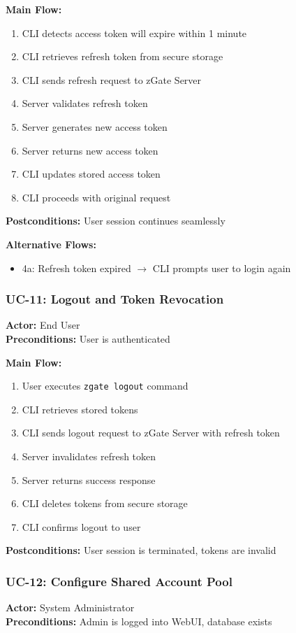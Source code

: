 \textbf{Main Flow:}
\begin{enumerate}
    \item CLI detects access token will expire within 1 minute
    \item CLI retrieves refresh token from secure storage
    \item CLI sends refresh request to zGate Server
    \item Server validates refresh token
    \item Server generates new access token
    \item Server returns new access token
    \item CLI updates stored access token
    \item CLI proceeds with original request
\end{enumerate}

\textbf{Postconditions:} User session continues seamlessly

\textbf{Alternative Flows:}
\begin{itemize}
    \item 4a: Refresh token expired $\rightarrow$ CLI prompts user to login again
\end{itemize}

\subsubsection{UC-11: Logout and Token Revocation}
\textbf{Actor:} End User \\
\textbf{Preconditions:} User is authenticated

\textbf{Main Flow:}
\begin{enumerate}
    \item User executes \texttt{zgate logout} command
    \item CLI retrieves stored tokens
    \item CLI sends logout request to zGate Server with refresh token
    \item Server invalidates refresh token
    \item Server returns success response
    \item CLI deletes tokens from secure storage
    \item CLI confirms logout to user
\end{enumerate}

\textbf{Postconditions:} User session is terminated, tokens are invalid

\subsubsection{UC-12: Configure Shared Account Pool}
\textbf{Actor:} System Administrator \\
\textbf{Preconditions:} Admin is logged into WebUI, database exists

